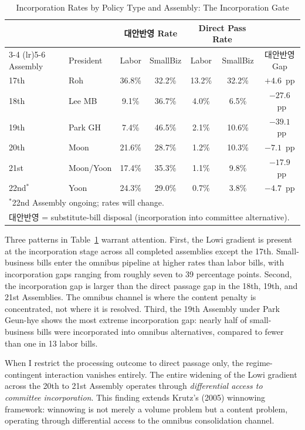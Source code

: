 \documentclass[11pt]{article}
\begin{document}
\begin{table}[H]
\centering
\caption{Incorporation Rates by Policy Type and Assembly: The Incorporation Gate}
\label{tab:incorp}
\begin{tabular}{llccccc}
\toprule
 & & \multicolumn{2}{c}{대안반영 Rate} & \multicolumn{2}{c}{Direct Pass Rate} & \\
\cmidrule(lr){3-4} \cmidrule(lr){5-6}
Assembly & President & Labor & SmallBiz & Labor & SmallBiz & 대안반영 Gap \\
\midrule
17th & Roh             & 36.8\% & 32.2\% & 13.2\% & 32.2\% & $+4.6$~pp \\
18th & Lee MB          & 9.1\%  & 36.7\% & 4.0\%  & 6.5\%  & $-27.6$~pp \\
19th & Park GH         & 7.4\%  & 46.5\% & 2.1\%  & 10.6\% & $-39.1$~pp \\
20th & Moon            & 21.6\% & 28.7\% & 1.2\%  & 10.3\% & $-7.1$~pp \\
21st & Moon/Yoon       & 17.4\% & 35.3\% & 1.1\%  & 9.8\%  & $-17.9$~pp \\
22nd$^*$ & Yoon        & 24.3\% & 29.0\% & 0.7\%  & 3.8\%  & $-4.7$~pp \\
\bottomrule
\multicolumn{7}{l}{\footnotesize $^*$22nd Assembly ongoing; rates will change.} \\
\multicolumn{7}{l}{\footnotesize 대안반영 = substitute-bill disposal (incorporation into committee alternative).} \\
\end{tabular}
\end{table}

Three patterns in Table~\ref{tab:incorp} warrant attention. First, the Lowi gradient is present at the incorporation stage across all completed assemblies except the 17th. Small-business bills enter the omnibus pipeline at higher rates than labor bills, with incorporation gaps ranging from roughly seven to 39 percentage points. Second, the incorporation gap is larger than the direct passage gap in the 18th, 19th, and 21st Assemblies. The omnibus channel is where the content penalty is concentrated, not where it is resolved. Third, the 19th Assembly under Park Geun-hye shows the most extreme incorporation gap: nearly half of small-business bills were incorporated into omnibus alternatives, compared to fewer than one in 13 labor bills.

When I restrict the processing outcome to direct passage only, the regime-contingent interaction vanishes entirely. The entire widening of the Lowi gradient across the 20th to 21st Assembly operates through \emph{differential access to committee incorporation}. This finding extends Krutz's (2005) winnowing framework: winnowing is not merely a volume problem but a content problem, operating through differential access to the omnibus consolidation channel.
\end{document}
